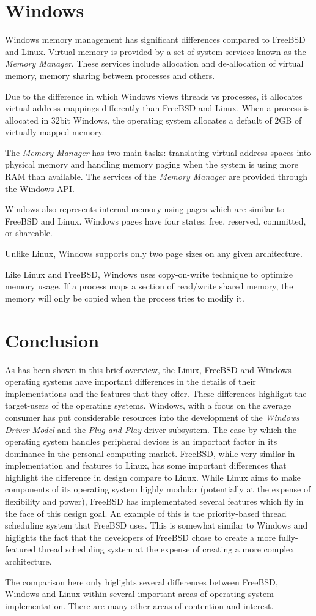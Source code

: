 \documentclass[onecolumn,10pt]{IEEETran}
\begin{document}
\section{Windows}

Windows memory management has significant differences compared to FreeBSD and Linux.  Virtual memory is provided by a set of system services known as the \textit{Memory Manager}.  These services include allocation and de-allocation of virtual memory, memory sharing between processes and others.

Due to the difference in which Windows views threads vs processes, it allocates virtual address mappings differently than FreeBSD and Linux.  When a process is allocated in 32bit Windows, the operating system allocates a default of 2GB of virtually mapped memory.

The \textit{Memory Manager} has two main tasks: translating virtual address spaces into physical memory and handling memory paging when the system is using more RAM than available.  The services of the \textit{Memory Manager} are provided through the Windows API.

Windows also represents internal memory using pages which are similar to FreeBSD and Linux.  Windows pages have four states: free, reserved, committed, or shareable.

Unlike Linux, Windows supports only two page sizes on any given architecture.

Like Linux and FreeBSD, Windows uses copy-on-write technique to optimize memory usage.  If a process maps a section of read/write shared memory, the memory will only be copied when the process tries to modify it.

\section{Conclusion}

As has been shown in this brief overview, the Linux, FreeBSD and Windows operating systems have important differences in the details of their implementations and the features that they offer.  These differences highlight the target-users of the operating systems.  Windows, with a focus on the average consumer has put considerable resources into the development of the \textit{Windows Driver Model} and the \textit{Plug and Play} driver subsystem.  The ease by which the operating system handles peripheral devices is an important factor in its dominance in the personal computing market.  FreeBSD, while very similar in implementation and features to Linux, has some important differences that highlight the difference in design compare to Linux.  While Linux aims to make components of its operating system highly modular (potentially at the expense of flexibility and power), FreeBSD has implementated several features which fly in the face of this design goal.  An example of this is the priority-based thread scheduling system that FreeBSD uses.  This is somewhat similar to Windows and higlights the fact that the developers of FreeBSD chose to create a more fully-featured thread scheduling system at the expense of creating a more complex architecture.

The comparison here only higlights  several differences between FreeBSD, Windows and Linux within several important areas of operating system implementation.  There are many other areas of contention and interest.



\newpage
\end{document}
